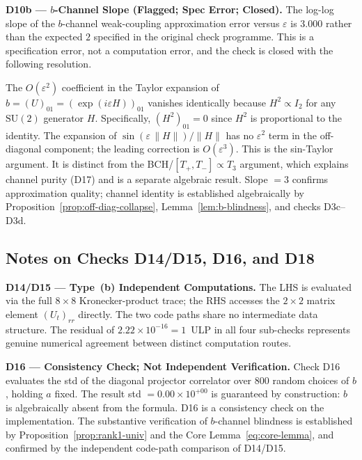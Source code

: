 \documentclass[12pt]{article}
\numberwithin{equation}{section}
\theoremstyle{plain}
\theoremstyle{definition}
\theoremstyle{remark}
\newcommand{\su}{\mathrm{SU}}              %
\begin{document}
		\noindent
		\textbf{D10b --- $b$-Channel Slope (Flagged; Spec Error; Closed).}
		The log-log slope of the $b$-channel weak-coupling approximation
		error versus $\varepsilon$ is $3.000$ rather than the expected $2$
		specified in the original check programme.  This is a specification
		error, not a computation error, and the check is closed with the
		following resolution.
		
		The $O(\varepsilon^{2})$ coefficient in the Taylor expansion of
		$b = (U)_{01} = (\exp(i\varepsilon H))_{01}$ vanishes identically
		because $H^{2}\propto I_2$ for any $\su(2)$ generator $H$.
		Specifically, $(H^{2})_{01} = 0$ since $H^{2}$ is proportional to the
		identity.  The expansion of $\sin(\varepsilon\,\|H\|)/\|H\|$ has no
		$\varepsilon^{2}$ term in the off-diagonal component; the leading
		correction is $O(\varepsilon^{3})$.  This is the sin-Taylor argument.
		It is distinct from the BCH/$[T_{+},T_{-}]\propto T_{3}$ argument,
		which explains channel purity (D17) and is a separate algebraic
		result.  Slope $=3$ confirms approximation quality; channel identity
		is established algebraically by
		Proposition~\ref{prop:off-diag-collapse},
		Lemma~\ref{lem:b-blindness}, and checks D3c--D3d.
		
		\subsection{Notes on Checks D14/D15, D16, and D18}
		\label{sec:notes-checks}
		
		\noindent
		\textbf{D14/D15 --- Type~(b) Independent Computations.}
		The LHS is evaluated via the full $8\times 8$ Kronecker-product
		trace; the RHS accesses the $2\times 2$ matrix element $(U_t)_{rr}$
		directly.  The two code paths share no intermediate data structure.
		The residual of $2.22\times 10^{-16} = 1$~ULP in all four sub-checks
		represents genuine numerical agreement between distinct computation
		routes.
		
		\medskip\noindent
		\textbf{D16 --- Consistency Check; Not Independent Verification.}
		Check D16 evaluates the std of the diagonal projector correlator
		over $800$ random choices of $b$, holding $a$ fixed.  The result
		std $= 0.00\times 10^{+00}$ is guaranteed by construction: $b$ is
		algebraically absent from the formula.  D16 is a consistency check
		on the implementation.  The substantive verification of $b$-channel
		blindness is established by Proposition~\ref{prop:rank1-univ} and
		the Core Lemma~\eqref{eq:core-lemma}, and confirmed by the
		independent code-path comparison of D14/D15.
		
\end{document}
